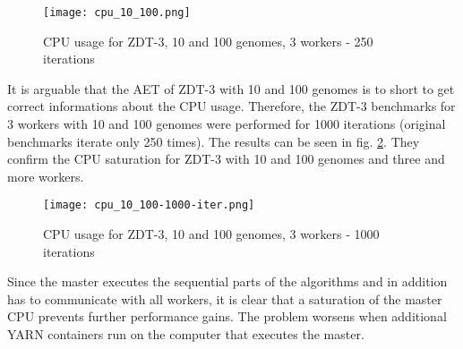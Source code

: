 \begin{figure}
  \centering
  \texttt{[image: cpu\_10\_100.png]}
  \caption[CPU usage for ZDT-3, 10 and 100 genomes, 3 workers]{CPU usage for ZDT-3, 10 and 100 genomes, 3 workers - 250 iterations}
  \label{fig:cpu_10_100}
\end{figure}

It is arguable that the AET of ZDT-3 with 10 and 100 genomes is to short to get correct informations about the CPU usage. Therefore, the ZDT-3 benchmarks for 3 workers with 10 and 100 genomes were performed for 1000 iterations (original benchmarks iterate only 250 times). The results can be seen in fig. \ref{fig:cpu_10_100-1000-iter}. They confirm the CPU saturation for ZDT-3 with 10 and 100 genomes and three and more workers.

\begin{figure}
  \centering
  \texttt{[image: cpu\_10\_100-1000-iter.png]}
  \caption[CPU usage for ZDT-3, 10 and 100 genomes, 3 workers]{CPU usage for ZDT-3, 10 and 100 genomes, 3 workers - 1000 iterations}
  \label{fig:cpu_10_100-1000-iter}
\end{figure}

Since the master executes the sequential parts of the algorithms and in addition has to communicate with all workers, it is clear that a saturation of the master CPU prevents further performance gains. The problem worsens when additional YARN containers run on the computer that executes the master.

